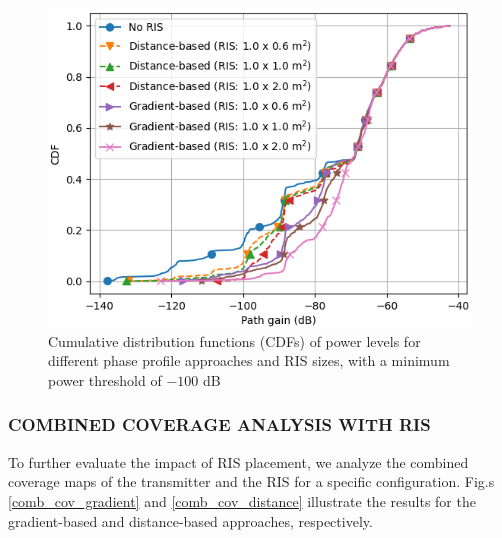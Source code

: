 \documentclass{IEEEoj}
\begin{document}
\begin{figure}
	\centering \includegraphics[width=\linewidth]{Sim_Results/CDF_-100dB.png}
	\caption{Cumulative distribution functions (CDFs) of power levels for different phase profile approaches and RIS sizes, with a minimum power threshold of $-100$ dB}
	\label{CDF_-100dB}
\end{figure}

\subsubsection{COMBINED COVERAGE ANALYSIS WITH RIS}
To further evaluate the impact of RIS placement, we analyze the combined coverage maps of the transmitter and the RIS for a specific configuration. Fig.s \ref{comb_cov_gradient} and \ref{comb_cov_distance} illustrate the results for the gradient-based and distance-based approaches, respectively.
\end{document}
